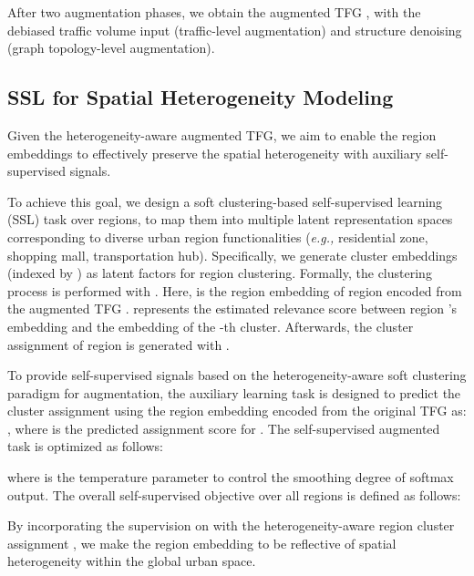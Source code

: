 \documentclass[letterpaper]{article} \usepackage{aaai23}  \usepackage{times}  \usepackage{helvet}  \usepackage{courier}  \usepackage[hyphens]{url}  \usepackage{graphicx} \urlstyle{rm} \def\UrlFont{\rm}  \usepackage{natbib}  \usepackage{caption} \frenchspacing  \setlength{\pdfpagewidth}{8.5in} \setlength{\pdfpageheight}{11in}
\newcommand{\eg}{\emph{e.g.,}\xspace}
\begin{document}
After two augmentation phases, we obtain the augmented TFG , with the debiased traffic volume input  (traffic-level augmentation) and structure denoising  (graph topology-level augmentation).





\subsection{SSL for Spatial Heterogeneity Modeling}



Given the heterogeneity-aware augmented TFG, we aim to enable the region embeddings to effectively preserve the spatial heterogeneity with auxiliary self-supervised signals.

To achieve this goal, we design a soft clustering-based self-supervised learning (SSL) task over regions, to map them into multiple latent representation spaces corresponding to diverse urban region functionalities (\eg residential zone, shopping mall, transportation hub). Specifically, we generate  cluster embeddings  (indexed by ) as latent factors for region clustering. Formally, the clustering process is performed with . Here,  is the region embedding of region  encoded from the augmented TFG .  represents the estimated relevance score between region 's embedding and the embedding  of the -th cluster. Afterwards, the cluster assignment of region  is generated with .



To provide self-supervised signals based on the heterogeneity-aware soft clustering paradigm for augmentation, the auxiliary learning task is designed to predict the cluster assignment using the region embedding  encoded from the original TFG  as: , where  is the predicted assignment score for . The self-supervised augmented task is optimized as follows:

\noindent where  is the temperature parameter to control the smoothing degree of softmax output. The overall self-supervised objective over all regions is defined as follows:




By incorporating the supervision on  with the heterogeneity-aware region cluster assignment , we make the region embedding  to be reflective of spatial heterogeneity within the global urban space.\\\vspace{-0.12in}
\end{document}
